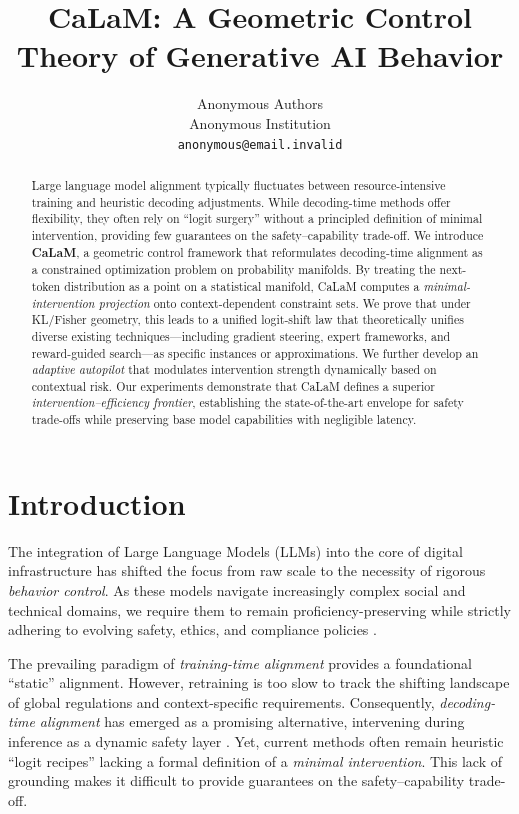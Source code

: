 \documentclass{article}
\title{CaLaM: A Geometric Control Theory of Generative AI Behavior}
\author{%
  Anonymous Authors \\
  Anonymous Institution \\
  \texttt{anonymous@email.invalid} \\
}
\date{}
\theoremstyle{plain}
\theoremstyle{definition}
\theoremstyle{remark}
\begin{document}
\maketitle


\begin{abstract}
Large language model alignment typically fluctuates between resource-intensive training and heuristic decoding adjustments. While decoding-time methods offer flexibility, they often rely on ``logit surgery'' without a principled definition of minimal intervention, providing few guarantees on the safety--capability trade-off. We introduce \textbf{CaLaM}, a geometric control framework that reformulates decoding-time alignment as a constrained optimization problem on probability manifolds. By treating the next-token distribution as a point on a statistical manifold, CaLaM computes a \textit{minimal-intervention projection} onto context-dependent constraint sets. We prove that under KL/Fisher geometry, this leads to a unified logit-shift law that theoretically unifies diverse existing techniques---including gradient steering, expert frameworks, and reward-guided search---as specific instances or approximations. We further develop an \textit{adaptive autopilot} that modulates intervention strength dynamically based on contextual risk. Our experiments demonstrate that CaLaM defines a superior \textit{intervention--efficiency frontier}, establishing the state-of-the-art envelope for safety trade-offs while preserving base model capabilities with negligible latency.
\end{abstract}


\section{Introduction}

The integration of Large Language Models (LLMs) into the core of digital infrastructure has shifted the focus from raw scale to the necessity of rigorous \emph{behavior control}. As these models navigate increasingly complex social and technical domains, we require them to remain proficiency-preserving while strictly adhering to evolving safety, ethics, and compliance policies \citep{amodei2016concrete,ouyang2022training}.

The prevailing paradigm of \emph{training-time alignment} \citep{rafailov2023dpo,bai2022constitutional} provides a foundational ``static'' alignment. However, retraining is too slow to track the shifting landscape of global regulations and context-specific requirements. Consequently, \emph{decoding-time alignment} has emerged as a promising alternative, intervening during inference as a dynamic safety layer \citep{dathathri2020plug,krause2021gedi,li2023inference}. Yet, current methods often remain heuristic ``logit recipes'' lacking a formal definition of a \emph{minimal intervention}. This lack of grounding makes it difficult to provide guarantees on the safety--capability trade-off.
\end{document}
